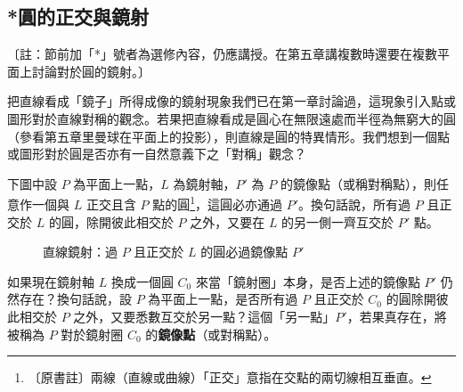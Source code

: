\subsection{*圓的正交與鏡射}
\label{sec:b4-3-6}

〔註：節前加「*」號者為選修內容，仍應講授。在第五章講複數時還要在複數平面上討論對於圓的鏡射。〕

把直線看成「鏡子」所得成像的鏡射現象我們已在第一章討論過，這現象引入點或圖形對於直線對稱的觀念。若果把直線看成是圓心在無限遠處而半徑為無窮大的圓（參看第五章里曼球在平面上的投影），則直線是圓的特異情形。我們想到一個點或圖形對於圓是否亦有一自然意義下之「對稱」觀念？

下圖中設 $P$ 為平面上一點，$L$ 為鏡射軸，$P'$ 為 $P$ 的鏡像點（或稱對稱點），則任意作一個與 $L$ 正交且含 $P$ 點的圓\label{note:b4-ch3-ortho-def}\footnote{〔原書註〕兩線（直線或曲線）「正交」意指在交點的兩切線相互垂直。}，這圓必亦通過 $P'$。換句話說，所有過 $P$ 且正交於 $L$ 的圓，除開彼此相交於 $P$ 之外，又要在 $L$ 的另一側一齊互交於 $P'$ 點。

\begin{figure}[htbp]
\centering
{}
\caption{直線鏡射：過 $P$ 且正交於 $L$ 的圓必過鏡像點 $P'$}
\label{fig:b4-3-37}
\end{figure}

如果現在鏡射軸 $L$ 換成一個圓 $C_0$ 來當「鏡射圈」本身，是否上述的鏡像點 $P'$ 仍然存在？換句話說，設 $P$ 為平面上一點，是否所有過 $P$ 且正交於 $C_0$ 的圓除開彼此相交於 $P$ 之外，又要悉數互交於另一點？這個「另一點」$P'$，若果真存在，將被稱為 $P$ 對於鏡射圈 $C_0$ 的\textbf{鏡像點}（或對稱點）。

